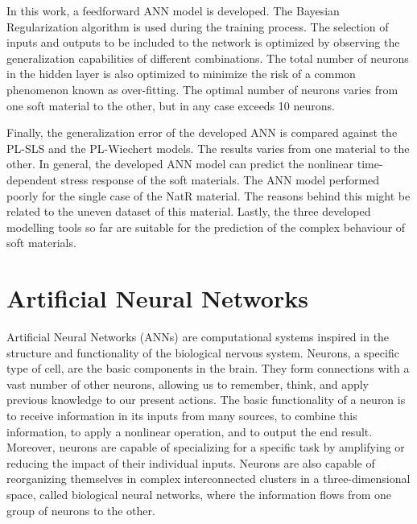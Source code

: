 In this work, a feedforward ANN model is developed. The Bayesian Regularization algorithm is used during the training process. The selection of inputs and outputs to be included to the network is optimized by observing the generalization capabilities of different combinations. The total number of neurons in the hidden layer is also optimized to minimize the risk of a common phenomenon known as over-fitting. The optimal number of neurons varies from one soft material to the other, but in any case exceeds 10 neurons.

Finally, the generalization error of the developed ANN is compared against the PL-SLS and the PL-Wiechert models. The results varies from one material to the other. In general, the developed ANN model can predict the nonlinear time-dependent stress response of the soft materials. The ANN model performed poorly for the single case of the NatR material. The reasons behind this might be related to the uneven dataset of this material. Lastly, the three developed modelling tools so far are suitable for the prediction of the complex behaviour of soft materials.

\section{Artificial Neural Networks}

Artificial Neural Networks (ANNs) are computational systems inspired in the structure and functionality of the biological nervous system. Neurons, a specific type of cell, are the basic components in the brain. They form connections with a vast number of other neurons, allowing us to remember, think, and apply previous knowledge to our present actions. The basic functionality of a neuron is to receive information in its inputs from many sources, to combine this information, to apply a nonlinear operation, and to output the end result. Moreover, neurons are capable of specializing for a specific task by amplifying or reducing the impact of their individual inputs. Neurons are also capable of reorganizing themselves in complex interconnected clusters in a three-dimensional space, called biological neural networks, where the information flows from one group of neurons to the other.

